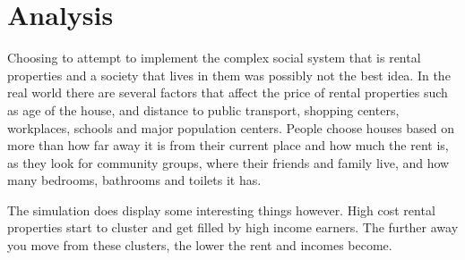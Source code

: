 \section{Analysis}

\par
Choosing to attempt to implement the complex social system that is rental properties and a society that lives in them was possibly not the best idea. In the real world there are several factors that affect the price of rental properties such as age of the house, and distance to public transport, shopping centers, workplaces, schools and major population centers. People choose houses based on more than how far away it is from their current place and how much the rent is, as they look for community groups, where their friends and family live, and how many bedrooms, bathrooms and toilets it has.

\par
The simulation does display some interesting things however. High cost rental properties start to cluster and get filled by high income earners. The further away you move from these clusters, the lower the rent and incomes become.